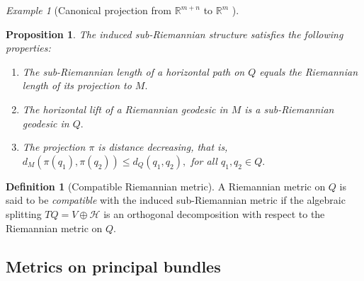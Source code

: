 \documentclass [xcolor=svgnames, t] {beamer}
\theoremstyle{definition}
\newtheorem{df}{Definition}
\theoremstyle{plain}
\newtheorem{prop}{Proposition}
\theoremstyle{remark}
\newtheorem{ex}{Example}
\begin{document}
\begin{frame}[allowframebreaks]
\begin{ex}[Canonical projection from $ \mathbb{R}^{m+n} $ to $ \mathbb{R}^m $  ]
\end{ex}
\begin{prop}
	The induced sub-Riemannian structure satisfies the following properties:
	\begin{enumerate}
		\item The sub-Riemannian length of a horizontal path on $ Q $ equals the Riemannian length of its projection to $ M. $ 
		\item The horizontal lift of a Riemannian geodesic in $ M $ is a sub-Riemannian geodesic in $ Q. $ 
		\item The projection $ \pi $ is distance decreasing, that is, $ d_M(\pi(q_1), \pi(q_2))\leq d_Q(q_1,q_2), $ for all $ q_1,q_2\in Q. $ 
	\end{enumerate}
\end{prop}
\begin{df}[Compatible Riemannian metric]\label{df:compatible}
	A Riemannian metric on $ Q $ is said to be \textit{compatible} with the induced sub-Riemannian metric if the algebraic splitting $ TQ = V \oplus \mathcal{H} $ is an orthogonal decomposition with respect to the Riemannian metric on $ Q$.  
\end{df}
\end{frame}
\subsection{Metrics on principal bundles}%
\label{sub:metrics_on_principal_bundles}
\end{document}
